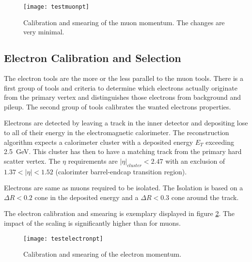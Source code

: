 \begin{figure}[h]
\centering
\texttt{[image: testmuonpt]}
\caption{Calibration and smearing of the muon momentum. The changes are very minimal.}
\label{fig:testmuonpt}
\end{figure}

\subsection{Electron Calibration and Selection}

The electron tools are the more or the less parallel to the muon tools. There is a first group of tools and criteria to determine which electrons actually originate from the primary vertex and distinguishes those electrons from background and pileup. The second group of tools calibrates the wanted electrons properties.

Electrons are detected by leaving a track in the inner detector and depositing lose to all of their energy in the electromagnetic calorimeter. The reconstruction algorithm expects a calorimeter cluster with a deposited energy $E_T$ exceeding \SI{2.5}{\GeV}. This cluster has then to have a matching track from the primary hard scatter vertex. The $\eta$ requirements are $|\eta|_{cluster} < 2.47$ with an exclusion of $\num{1.37} < |\eta| < \num{1.52}$ (calorimter barrel-endcap transition region).

Electrons are same as muons required to be isolated. The Isolation is based on a $\Delta R < \num{0.2}$ cone in the deposited energy and a $\Delta R < \num{0.3}$ cone around the track.

The electron calibration and smearing is exemplary displayed in figure \ref{fig:testelectronpt}. The impact of the scaling is significantly higher than for muons.

\begin{figure}
\centering
\texttt{[image: testelectronpt]}
\caption{Calibration and smearing of the electron momentum.}
\label{fig:testelectronpt}
\end{figure}